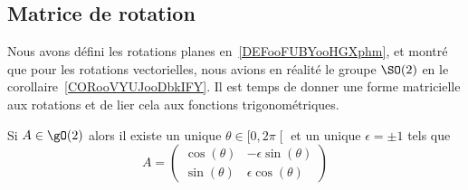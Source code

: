 \subsection{Matrice de rotation}

Nous avons défini les rotations planes en~\ref{DEFooFUBYooHGXphm}, et montré que pour les rotations vectorielles, nous avions en réalité le groupe \( \SO(2)\) en le corollaire~\ref{CORooVYUJooDbkIFY}. Il est temps de donner une forme matricielle aux rotations et de lier cela aux fonctions trigonométriques.

\begin{lemma}       \label{LEMooAJMAooXPSKtS}
    Si \( A\in \gO(2)\) alors il existe un unique \( \theta\in\mathopen[ 0 , 2\pi \mathclose[\) et un unique \( \epsilon=\pm 1\) tels que
    \begin{equation}
        A=\begin{pmatrix}
            \cos(\theta)    &   -\epsilon\sin(\theta)    \\
            \sin(\theta)    &   \epsilon\cos(\theta)
        \end{pmatrix}
    \end{equation}
\end{lemma}

